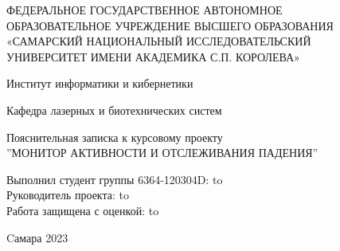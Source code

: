 \begin{titlepage}
\newpage
\doublespacing
\begin{center}
ФЕДЕРАЛЬНОЕ ГОСУДАРСТВЕННОЕ АВТОНОМНОЕ\\
ОБРАЗОВАТЕЛЬНОЕ УЧРЕЖДЕНИЕ ВЫСШЕГО ОБРАЗОВАНИЯ\\
«САМАРСКИЙ НАЦИОНАЛЬНЫЙ ИССЛЕДОВАТЕЛЬСКИЙ\\
УНИВЕРСИТЕТ ИМЕНИ АКАДЕМИКА С.П. КОРОЛЕВА»	
 \\
\end{center}

\vspace{5em}

\begin{center}
 Институт информатики и кибернетики \\ 
\end{center}

\begin{center}
Кафедра лазерных и биотехнических систем \\ 
\end{center}


\vspace{3em}

\begin{center}
{Пояснительная записка к курсовому проекту\\''МОНИТОР АКТИВНОСТИ И ОТСЛЕЖИВАНИЯ ПАДЕНИЯ''}
\end{center}

\vspace{11em}




\newbox{\lbox}
\newlength{\maxl}
\setlength{\maxl}{\wd\lbox}
\hfill\parbox{15cm}{
\hspace*{5cm}\hspace*{-5cm}Выполнил студент группы 6364-120304D:\hfill\underline{\hspace{4em}}  \hbox to\\
\hspace*{5cm}\hspace*{-5cm}Руководитель проекта:\hfill\underline{\hspace{4em}}  \hbox to\\
\hspace*{5cm}\hspace*{-5cm}Работа защищена с оценкой:\hfill\underline{\hspace{4em}}  \hbox to\maxl{ \hfill }\\
}


\vspace{\fill}

\begin{center}
Cамара 2023
\end{center}

\end{titlepage}